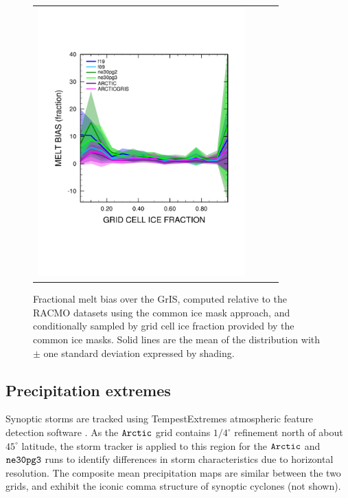 \documentclass[draft]{agujournal2019}
\begin{document}
\begin{figure}[t]
\begin{center}
\begin{tabular}{cccc}
         \includegraphics[width=80mm]{figs/temp_xy_diffRACMO_melt.pdf}
\end{tabular}
\end{center}
\caption{Fractional melt bias over the GrIS, computed relative to the RACMO datasets using the common ice mask approach, and conditionally sampled by grid cell ice fraction provided by the common ice masks. Solid lines are the mean of the distribution with $\pm$ one standard deviation expressed by shading.}
\label{fig:bias}
\end{figure}

\subsection{Precipitation extremes}

Synoptic storms are tracked using TempestExtremes atmospheric feature detection software \cite{UETAL2021}. As the $\tt Arctic$ grid contains $1/4^{\circ}$ refinement north of about $45^{\circ}$ latitude, the storm tracker is applied to this region for the $\tt Arctic$ and $\tt ne30pg3$ runs to identify differences in storm characteristics due to horizontal resolution. The composite mean precipitation maps are similar between the two grids, and exhibit the iconic comma structure of synoptic cyclones (not shown). {\color{purple}{Marcus - no need to mention if not shown.}}
\end{document}
